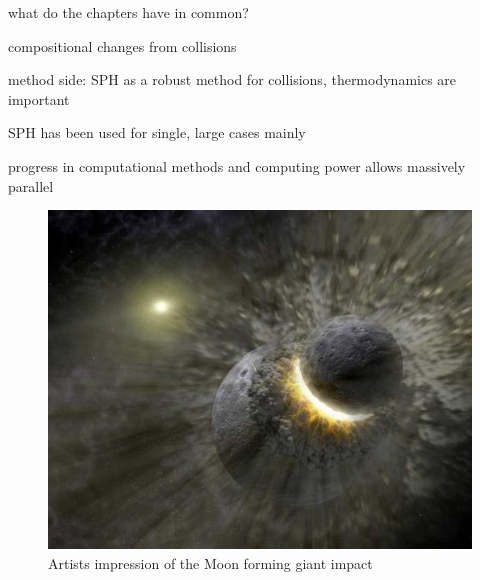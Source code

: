 what do the chapters have in common?

compositional changes from collisions

method side: SPH as a robust method for collisions, thermodynamics are important

SPH has been used for single, large cases mainly \cite{2005Natur.435..629S}

progress in computational methods and computing power allows massively parallel 


\begin{figure}
\begin{center}
\includegraphics[scale=0.6]{01planet-collision.jpg}
\caption{Artists impression of the Moon forming giant impact}
\label{ch01_fig01}
\end{center}
\end{figure}








